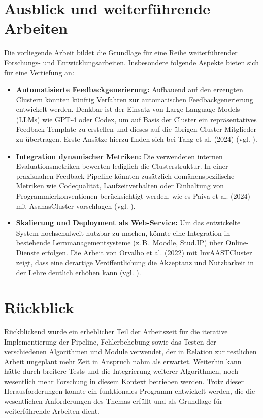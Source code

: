\section*{Ausblick und weiterführende Arbeiten}
Die vorliegende Arbeit bildet die Grundlage für eine Reihe weiterführender Forschungs- und Entwicklungsarbeiten. Insbesondere folgende Aspekte bieten sich für eine Vertiefung an:

\begin{itemize}
    \item \textbf{Automatisierte Feedbackgenerierung:} Aufbauend auf den erzeugten Clustern könnten künftig Verfahren zur automatischen Feedbackgenerierung entwickelt werden. Denkbar ist der Einsatz von Large Language Models (LLMs) wie GPT-4 oder Codex, um auf Basis der Cluster ein repräsentatives Feedback-Template zu erstellen und dieses auf die übrigen Cluster-Mitglieder zu übertragen. Erste Ansätze hierzu finden sich bei Tang et al. (2024) (vgl. \cite{Tang.21.10.2024}).
    \item \textbf{Integration dynamischer Metriken:} Die verwendeten internen Evaluationsmetriken bewerten lediglich die Clusterstruktur. In einer praxisnahen Feedback-Pipeline könnten zusätzlich domänenspezifische Metriken wie Codequalität, Laufzeitverhalten oder Einhaltung von Programmierkonventionen berücksichtigt werden, wie es Paiva et al. (2024) mit AsanasCluster vorschlagen (vgl. \cite{Paiva.2024}).
    \item \textbf{Skalierung und Deployment als Web-Service:} Um das entwickelte System hochschulweit nutzbar zu machen, könnte eine Integration in bestehende Lernmanagementsysteme (z.\,B.\ Moodle, Stud.IP) über Online-Dienste erfolgen. Die Arbeit von Orvalho et al. (2022) mit InvAASTCluster zeigt, dass eine derartige Veröffentlichung die Akzeptanz und Nutzbarkeit in der Lehre deutlich erhöhen kann (vgl. \cite{Orvalho.28.06.2022}).
\end{itemize}

\section*{Rückblick}
Rückblickend wurde ein erheblicher Teil der Arbeitszeit für die iterative Implementierung der Pipeline, Fehlerbehebung sowie das Testen der verschiedenen Algorithmen und Module verwendet, der in Relation zur restlichen Arbeit ungeplant mehr Zeit in Anspruch nahm als erwartet. Weiterhin kann hätte durch breitere Tests und die Integrierung weiterer Algorithmen, noch wesentlich mehr Forschung in diesem Kontext betrieben werden. Trotz dieser Herausforderungen konnte ein funktionales Programm entwickelt werden, die die wesentlichen Anforderungen des Themas erfüllt und als Grundlage für weiterführende Arbeiten dient.
